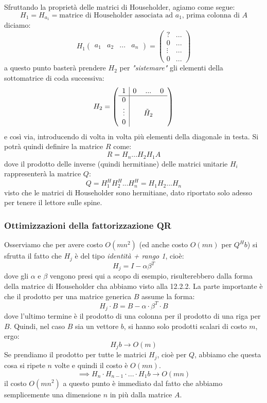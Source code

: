 \documentclass[a4paper,11pt]{article}
\begin{document}
Sfruttando la proprietà delle matrici di Householder, agiamo come segue:
$$
H_1 = H_{a_1} = \text{matrice di Householder associata ad $a_1$, prima colonna di $A$}
$$
diciamo:
$$
H_1 \begin{pmatrix}
	a_1 & a_2 & ... & a_n
\end{pmatrix} =
\begin{pmatrix}
	? & ... \\
	0 & ... \\ 
	\vdots & ... \\ 
	0 & ...
\end{pmatrix}
$$
a questo punto basterà prendere $H_2$ per \textit{"sistemare"} gli elementi della sottomatrice di coda successiva:
$$
H_2 = \left( \begin{array}{c| c c c}
	1 & 0 & ... & 0 \\
	\hline
	0 & & & \\
	\vdots & & \tilde{H}_2 & \\
	0 & & & \\
\end{array} \right)
$$
e così via, introducendo di volta in volta più elementi della diagonale in testa.
Si potrà quindi definire la matrice $R$ come:
$$
R = H_n ... H_2 H_1 A
$$
dove il prodotto delle inverse (quindi hermitiane) delle matrici unitarie $H_i$ rappresenterà la matrice $Q$:
$$
Q = H_1^H H_2^H ... H_n^H = H_1 H_2 ... H_n
$$
visto che le matrici di Householder sono hermitiane, dato riportato solo adesso per tenere il lettore sulle spine.

\subsubsection{Ottimizzazioni della fattorizzazione QR}
Osserviamo che per avere costo $O(mn^2)$ (ed anche costo $O(mn)$ per $Q^H b$) si sfrutta il fatto che $H_j$ è del tipo \textit{identità + rango 1}, cioè:
$$
H_j = I - \alpha \beta^T
$$
dove gli $\alpha$ e $\beta$ vengono presi qui a scopo di esempio, risulterebbero dalla forma della matrice di Householder cha abbiamo visto alla 12.2.2.
La parte importante è che il prodotto per una matrice generica $B$ assume la forma:
$$
H_j \cdot B = B - \alpha \cdot \beta^T \cdot B
$$
dove l'ultimo termine è il prodotto di una colonna per il prodotto di una riga per $B$.
Quindi, nel caso $B$ sia un vettore $b$, si hanno solo prodotti scalari di costo $m$, ergo:
$$
H_j b \rightarrow O(m)
$$
Se prendiamo il prodotto per tutte le matrici $H_j$, cioè per $Q$, abbiamo che questa cosa si ripete $n$ volte e quindi il costo è $O(mn)$.
$$
\implies H_n \cdot H_{n - 1} \cdot ... \cdot H_1 b \rightarrow O(mn)
$$
il costo $O(mn^2)$ a questo punto è immediato dal fatto che abbiamo semplicemente una dimensione $n$ in più dalla matrice $A$.
\end{document}
